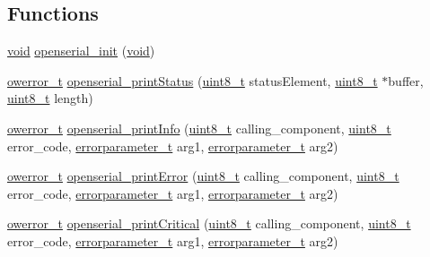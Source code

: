 \subsection*{Functions}
\begin{DoxyCompactItemize}
\item 
\hyperlink{usb__devapi_8h_afabf60e7f57651d6d595a02c75f07cd0}{void} \hyperlink{group___open_serial_ga3aa92123f96623345dbb33677c9f4bb4}{openserial\+\_\+init} (\hyperlink{usb__devapi_8h_afabf60e7f57651d6d595a02c75f07cd0}{void})
\item 
\hyperlink{opendefs_8h_af20b7c3ed9d2ba19e56a309ad9314803}{owerror\+\_\+t} \hyperlink{group___open_serial_gac04f412c3d52f0ffc77e12edb1a49981}{openserial\+\_\+print\+Status} (\hyperlink{_p_e___types_8h_aba7bc1797add20fe3efdf37ced1182c5}{uint8\+\_\+t} status\+Element, \hyperlink{_p_e___types_8h_aba7bc1797add20fe3efdf37ced1182c5}{uint8\+\_\+t} $\ast$buffer, \hyperlink{_p_e___types_8h_aba7bc1797add20fe3efdf37ced1182c5}{uint8\+\_\+t} length)
\item 
\hyperlink{opendefs_8h_af20b7c3ed9d2ba19e56a309ad9314803}{owerror\+\_\+t} \hyperlink{group___open_serial_gadd292e5ac337122d8b696a589f5339ca}{openserial\+\_\+print\+Info} (\hyperlink{_p_e___types_8h_aba7bc1797add20fe3efdf37ced1182c5}{uint8\+\_\+t} calling\+\_\+component, \hyperlink{_p_e___types_8h_aba7bc1797add20fe3efdf37ced1182c5}{uint8\+\_\+t} error\+\_\+code, \hyperlink{opendefs_8h_ab3600b91f14426ad1962f368745f44fc}{errorparameter\+\_\+t} arg1, \hyperlink{opendefs_8h_ab3600b91f14426ad1962f368745f44fc}{errorparameter\+\_\+t} arg2)
\item 
\hyperlink{opendefs_8h_af20b7c3ed9d2ba19e56a309ad9314803}{owerror\+\_\+t} \hyperlink{group___open_serial_ga48608da7a1bdd73ed0d4528580a6bdeb}{openserial\+\_\+print\+Error} (\hyperlink{_p_e___types_8h_aba7bc1797add20fe3efdf37ced1182c5}{uint8\+\_\+t} calling\+\_\+component, \hyperlink{_p_e___types_8h_aba7bc1797add20fe3efdf37ced1182c5}{uint8\+\_\+t} error\+\_\+code, \hyperlink{opendefs_8h_ab3600b91f14426ad1962f368745f44fc}{errorparameter\+\_\+t} arg1, \hyperlink{opendefs_8h_ab3600b91f14426ad1962f368745f44fc}{errorparameter\+\_\+t} arg2)
\item 
\hyperlink{opendefs_8h_af20b7c3ed9d2ba19e56a309ad9314803}{owerror\+\_\+t} \hyperlink{group___open_serial_gad798b7b8d507d9cea07e7370dd1a04c1}{openserial\+\_\+print\+Critical} (\hyperlink{_p_e___types_8h_aba7bc1797add20fe3efdf37ced1182c5}{uint8\+\_\+t} calling\+\_\+component, \hyperlink{_p_e___types_8h_aba7bc1797add20fe3efdf37ced1182c5}{uint8\+\_\+t} error\+\_\+code, \hyperlink{opendefs_8h_ab3600b91f14426ad1962f368745f44fc}{errorparameter\+\_\+t} arg1, \hyperlink{opendefs_8h_ab3600b91f14426ad1962f368745f44fc}{errorparameter\+\_\+t} arg2)

\end{DoxyCompactItemize}
